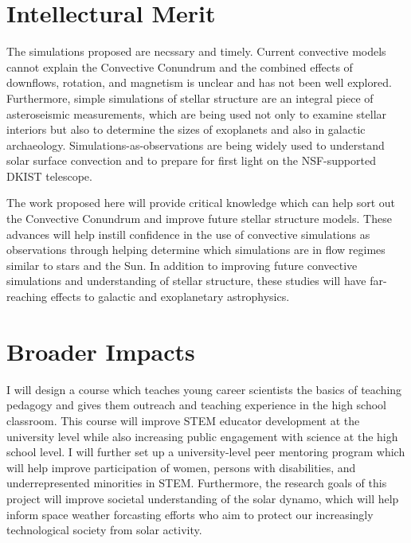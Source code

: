 \documentclass[aasms,11pt]{article}
\begin{document}
\vspace{-7pt}
\section{Intellectural Merit}
\vspace{-11pt}
The simulations proposed are necssary and timely. 
Current convective models cannot explain the Convective Conundrum and the combined effects of downflows, rotation, and magnetism is unclear and has not been well explored. 
Furthermore, simple simulations of stellar structure are an integral piece of asteroseismic measurements, which are being used not only to examine stellar interiors but also to determine the sizes of exoplanets and also in galactic archaeology. 
Simulations-as-observations are being widely used to understand solar surface convection and to prepare for first light on the NSF-supported DKIST telescope.

The work proposed here will provide critical knowledge which can help sort out the Convective Conundrum and improve future stellar structure models. 
These advances will help instill confidence in the use of convective simulations as observations through helping determine which simulations are in flow regimes similar to stars and the Sun. 
In addition to improving future convective simulations and understanding of stellar structure, these studies will have far-reaching effects to galactic and exoplanetary astrophysics.

\vspace{-7pt}
\section{Broader Impacts}
\vspace{-11pt}
I will design a course which teaches young career scientists the basics of teaching pedagogy and gives them outreach and teaching experience in the high school classroom.
This course will improve STEM educator development at the university level while also increasing public engagement with science at the high school level. 
I will further set up a university-level peer mentoring program which will help improve participation of women, persons with disabilities, and underrepresented minorities in STEM. 
Furthermore, the research goals of this project will improve societal understanding of the solar dynamo, which will help inform space weather forcasting efforts who aim to protect our increasingly technological society from solar activity.
\end{document}
